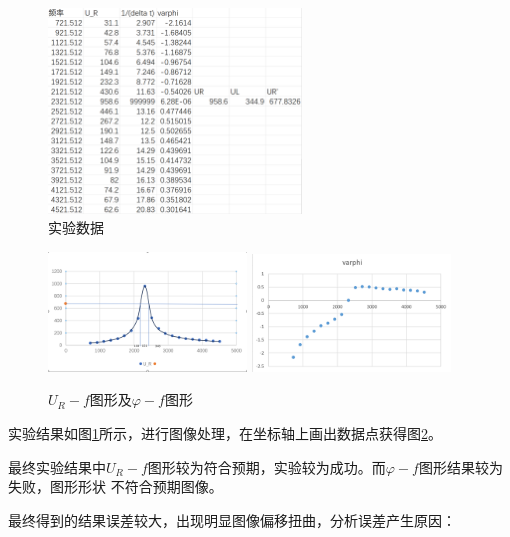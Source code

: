 \documentclass{ctexart}
\begin{document}
  \begin{figure}[H]\label{shujv}
    \centering
    \includegraphics[width=0.6\textwidth,height=0.4\textheight]{shujv.png}
    \caption{实验数据}
  \end{figure}

  \begin{figure}[H]\label{zuotu}
    \centering
    \begin{minipage}{\linewidth}
    \includegraphics[width=0.47\textwidth,height=0.3\textheight]{f_ur_zuotu.png}\hfill
    \includegraphics[width=0.47\textwidth,height=0.3\textheight]{f_varphi_zuotu.png}\hfill
    \end{minipage}
    \caption{$U_{R}-f$图形及$\varphi - f$图形}
  \end{figure}

  实验结果如图\ref{shujv}所示，进行图像处理，在坐标轴上画出数据点获得图\ref{zuotu}。

  最终实验结果中$U_{R}-f$图形较为符合预期，实验较为成功。而$\varphi - f$图形结果较为失败，图形形状
  不符合预期图像。

  最终得到的结果误差较大，出现明显图像偏移扭曲，分析误差产生原因：
\end{document}
